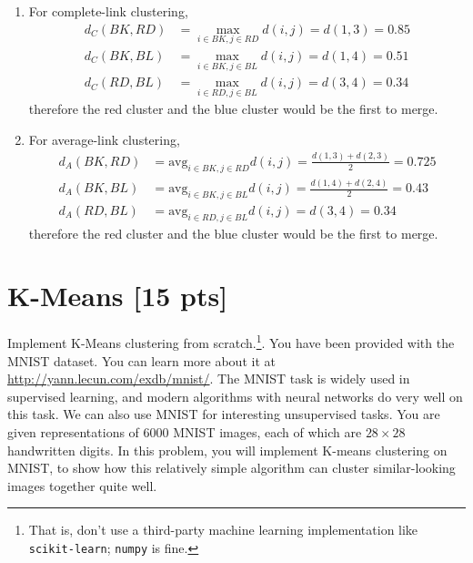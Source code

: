 \documentclass[submit]{harvardml}
\begin{document}
\begin{enumerate}
\begin{enumerate}
        \item For complete-link clustering,
        \begin{align*}
            d_C(BK, RD) &= \max_{i\in BK, j\in RD}d(i,j) = d(1,3) = 0.85 \\
            d_C(BK, BL) &= \max_{i\in BK, j\in BL}d(i,j) = d(1,4) = 0.51 \\
            d_C(RD, BL) &= \max_{i\in RD, j\in BL}d(i,j) = d(3,4) = 0.34
        \end{align*}
        therefore the red cluster and the blue cluster would be the first to merge.
        
        \item For average-link clustering,
        \begin{align*}
            d_A(BK, RD) &= \text{avg}_{i\in BK, j\in RD}d(i,j) = \frac{d(1,3) + d(2,3)}{2} = 0.725 \\
            d_A(BK, BL) &= \text{avg}_{i\in BK, j\in BL}d(i,j) = \frac{d(1,4) + d(2,4)}{2} = 0.43 \\
            d_A(RD, BL) &= \text{avg}_{i\in RD, j\in BL}d(i,j) = d(3,4) = 0.34
        \end{align*}
        therefore the red cluster and the blue cluster would be the first to merge.
    \end{enumerate}
\end{enumerate}
    
\newpage

\section*{K-Means [15 pts]}
Implement K-Means clustering from scratch.\footnote{That is, don't use a
third-party machine learning implementation like \texttt{scikit-learn};
\texttt{numpy} is fine.}. You have been provided with the MNIST dataset. You can
learn more about it at  \url{http://yann.lecun.com/exdb/mnist/}. The MNIST task
is widely used in supervised learning, and modern algorithms with neural
networks do very well on this task. We can also use MNIST for interesting
unsupervised tasks. You are given representations of 6000 MNIST images, each of
which are $28\times28$  handwritten digits. In this problem, you will implement
K-means clustering on MNIST, to show how this relatively simple algorithm can
cluster similar-looking images together quite well.
\end{document}
